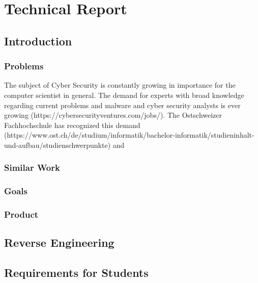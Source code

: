 \chapter{Technical Report}
\section{Introduction}
\subsection{Problems}
The subject of Cyber Security is constantly growing in importance for the computer scientist in general. The demand for experts with broad knowledge regarding current problems and malware and cyber security analysts is ever growing (https://cybersecurityventures.com/jobs/). The Ostschweizer Fachhochschule has recognized this demand (https://www.ost.ch/de/studium/informatik/bachelor-informatik/studieninhalt-und-aufbau/studienschwerpunkte) and 
\subsection{Similar Work}
\subsection{Goals}
\subsection{Product}
\section{Reverse Engineering}
\section{Requirements for Students}